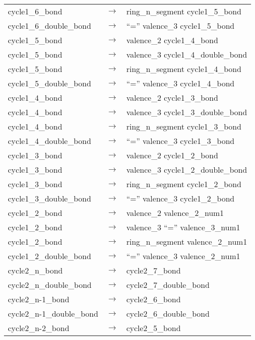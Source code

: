 \documentclass[../Document.tex]{subfiles}
\begin{document}
\begin{longtable}{m{} p{} p{}}
    cycle1\_6\_bond & $\rightarrow$ & ring\_n\_segment cycle1\_5\_bond \\
    cycle1\_6\_double\_bond & $\rightarrow$ & ``='' valence\_3 cycle1\_5\_bond \\
    cycle1\_5\_bond & $\rightarrow$ & valence\_2 cycle1\_4\_bond \\
    cycle1\_5\_bond & $\rightarrow$ & valence\_3 cycle1\_4\_double\_bond \\
    cycle1\_5\_bond & $\rightarrow$ & ring\_n\_segment cycle1\_4\_bond \\
    cycle1\_5\_double\_bond & $\rightarrow$ & ``='' valence\_3 cycle1\_4\_bond \\
    cycle1\_4\_bond & $\rightarrow$ & valence\_2 cycle1\_3\_bond \\
    cycle1\_4\_bond & $\rightarrow$ & valence\_3 cycle1\_3\_double\_bond \\
    cycle1\_4\_bond & $\rightarrow$ & ring\_n\_segment cycle1\_3\_bond \\
    cycle1\_4\_double\_bond & $\rightarrow$ & ``='' valence\_3 cycle1\_3\_bond \\
    cycle1\_3\_bond & $\rightarrow$ & valence\_2 cycle1\_2\_bond \\
    cycle1\_3\_bond & $\rightarrow$ & valence\_3 cycle1\_2\_double\_bond \\
    cycle1\_3\_bond & $\rightarrow$ & ring\_n\_segment cycle1\_2\_bond \\
    cycle1\_3\_double\_bond & $\rightarrow$ & ``='' valence\_3 cycle1\_2\_bond \\
    cycle1\_2\_bond & $\rightarrow$ & valence\_2 valence\_2\_num1 \\
    cycle1\_2\_bond & $\rightarrow$ & valence\_3 ``='' valence\_3\_num1 \\
    cycle1\_2\_bond & $\rightarrow$ & ring\_n\_segment valence\_2\_num1 \\
    cycle1\_2\_double\_bond & $\rightarrow$ & ``='' valence\_3 valence\_2\_num1 \\
    cycle2\_n\_bond & $\rightarrow$ & cycle2\_7\_bond \\
    cycle2\_n\_double\_bond & $\rightarrow$ & cycle2\_7\_double\_bond \\
    cycle2\_n-1\_bond & $\rightarrow$ & cycle2\_6\_bond \\
    cycle2\_n-1\_double\_bond & $\rightarrow$ & cycle2\_6\_double\_bond \\
    cycle2\_n-2\_bond & $\rightarrow$ & cycle2\_5\_bond \\

\end{longtable}
\end{document}
